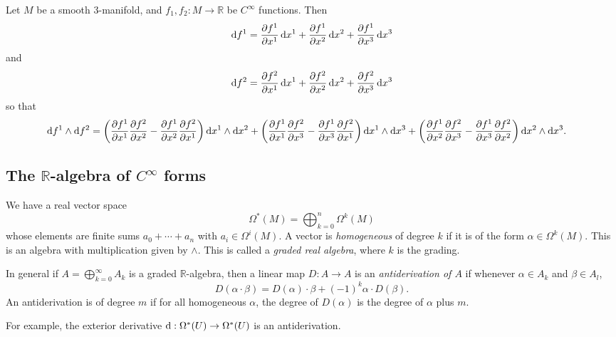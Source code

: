 \begin{xmpl}
Let $M$ be a smooth 3-manifold, and
$f_1, f_2 : M \to \mathbb{R}$ be $C^\infty$ functions. Then
$$
  \mathop{}\!\mathrm{d} f^1
= \frac{\partial f^1}{\partial x^1} \mathop{}\!\mathrm{d} x^1
+ \frac{\partial f^1}{\partial x^2} \mathop{}\!\mathrm{d} x^2
+ \frac{\partial f^1}{\partial x^3} \mathop{}\!\mathrm{d} x^3
$$
and
$$
  \mathop{}\!\mathrm{d} f^2
= \frac{\partial f^2}{\partial x^1} \mathop{}\!\mathrm{d} x^1
+ \frac{\partial f^2}{\partial x^2} \mathop{}\!\mathrm{d} x^2
+ \frac{\partial f^2}{\partial x^3} \mathop{}\!\mathrm{d} x^3
$$
so that
\begin{align*}
   \dif f^1 \wedge \dif f^2
&= \left(
     \frac{\partial f^1}{\partial x^1}
     \frac{\partial f^2}{\partial x^2}
   - \frac{\partial f^1}{\partial x^2}
     \frac{\partial f^2}{\partial x^1}
   \right)
   \dif x^1 \wedge \dif x^2
 +  \left(
     \frac{\partial f^1}{\partial x^1}
     \frac{\partial f^2}{\partial x^3}
   - \frac{\partial f^1}{\partial x^3}
     \frac{\partial f^2}{\partial x^1}
   \right)
   \dif x^1 \wedge \dif x^3
 +  \left(
     \frac{\partial f^1}{\partial x^2}
     \frac{\partial f^2}{\partial x^3}
   - \frac{\partial f^1}{\partial x^3}
     \frac{\partial f^2}{\partial x^2}
   \right)
   \dif x^2 \wedge \dif x^3.
\end{align*}

\end{xmpl}

\subsection{The $\mathbb{R}$-algebra of $C^\infty$ forms}
We have a real vector space
$$
  \Omega^\ast(M)
= \bigoplus_{k=0}^n
    \Omega^k(M)
$$
whose elements are finite sums $a_0 + \cdots + a_n$ with
$a_i \in \Omega^i(M)$. A vector is \emph{homogeneous}
of degree $k$ if it is of the form
$\alpha \in \Omega^k(M)$. This is an algebra with multiplication given
by $\wedge$. This is called a \emph{graded real algebra}, where $k$ is
the grading.

\begin{defn}
In general if $A = \bigoplus_{k=0}^\infty A_k$ is a graded
$\mathbb{R}$-algebra, then a linear map
$D: A \to A$ is an \emph{antiderivation of $A$} if whenever
$\alpha \in A_k$ and $\beta \in A_l$,
$$
  D(\alpha \cdot \beta)
= D(\alpha)\cdot\beta + (-1)^k \alpha \cdot D(\beta).
$$
An antiderivation is of degree $m$ if for all homogeneous
$\alpha$, the degree of $D(\alpha)$ is the degree of $\alpha$ plus
$m$.
\end{defn}

For example, the exterior derivative
$\mathop{}\!\mathrm{d} : \Omega^\ast(U) \to \Omega^\ast(U)$ is an antiderivation.

